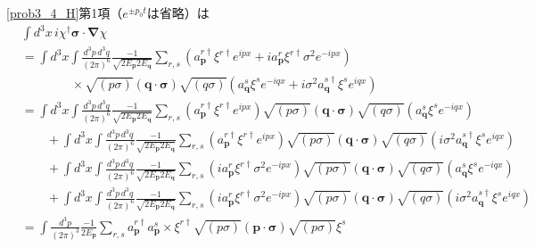 \eqref{prob3_4_H}第1項（$e^{\pm p_0t}$は省略）は
\begin{align*}
  & \int d^3x \, i \chi^\dagger \boldsymbol{\sigma} \cdot \boldsymbol{\nabla} \chi \\
  & = \int d^3x \int \frac{d^3p\, d^3q}{(2\pi)^6} \frac{-1}{\sqrt{2E_{\boldsymbol{p}} 2 E_{\boldsymbol{q}}}}
  \sum_{r, s} \left( a_{\boldsymbol{p}}^{r\dagger} \xi^{r\dagger} e^{ipx} + i a_{\boldsymbol{p}}^{r} \xi^{r\dagger} \sigma^2 e^{-ipx} \right) \\
  & \qquad \qquad \times \sqrt{(p \sigma)} (\boldsymbol{q} \cdot \boldsymbol{\sigma}) \sqrt{(q \sigma)}
  \left( a_{\boldsymbol{q}}^s \xi^s e^{-iqx} + i \sigma^2 a_{\boldsymbol{q}}^{s\dagger} \xi^s e^{iqx} \right) \\
  & = \int d^3x \int \frac{d^3p\, d^3q}{(2\pi)^6} \frac{-1}{\sqrt{2E_{\boldsymbol{p}} 2 E_{\boldsymbol{q}}}}
  \sum_{r, s} \left( a_{\boldsymbol{p}}^{r\dagger} \xi^{r\dagger} e^{ipx} \right)
  \sqrt{(p \sigma)} (\boldsymbol{q} \cdot \boldsymbol{\sigma}) \sqrt{(q \sigma)}
  \left( a_{\boldsymbol{q}}^s \xi^s e^{-iqx} \right) \\
  & \qquad + \int d^3x \int \frac{d^3p\, d^3q}{(2\pi)^6} \frac{-1}{\sqrt{2E_{\boldsymbol{p}} 2 E_{\boldsymbol{q}}}}
  \sum_{r, s} \left( a_{\boldsymbol{p}}^{r\dagger} \xi^{r\dagger} e^{ipx} \right)
  \sqrt{(p \sigma)} (\boldsymbol{q} \cdot \boldsymbol{\sigma}) \sqrt{(q \sigma)}
  \left( i \sigma^2 a_{\boldsymbol{q}}^{s\dagger} \xi^s e^{iqx} \right) \\
  & \qquad + \int d^3x \int \frac{d^3p\, d^3q}{(2\pi)^6} \frac{-1}{\sqrt{2E_{\boldsymbol{p}} 2 E_{\boldsymbol{q}}}}
  \sum_{r, s} \left( i a_{\boldsymbol{p}}^{r} \xi^{r\dagger} \sigma^2 e^{-ipx} \right)
  \sqrt{(p \sigma)} (\boldsymbol{q} \cdot \boldsymbol{\sigma}) \sqrt{(q \sigma)}
  \left( a_{\boldsymbol{q}}^s \xi^s e^{-iqx}\right) \\
  & \qquad + \int d^3x \int \frac{d^3p\, d^3q}{(2\pi)^6} \frac{-1}{\sqrt{2E_{\boldsymbol{p}} 2 E_{\boldsymbol{q}}}}
  \sum_{r, s} \left( i a_{\boldsymbol{p}}^{r} \xi^{r\dagger} \sigma^2 e^{-ipx} \right)
  \sqrt{(p \sigma)} (\boldsymbol{q} \cdot \boldsymbol{\sigma}) \sqrt{(q \sigma)}
  \left( i \sigma^2 a_{\boldsymbol{q}}^{s\dagger} \xi^s e^{iqx} \right) \\
  & = \int \frac{d^3p}{(2\pi)^3} \frac{-1}{2E_{\boldsymbol{p}}}
  \sum_{r, s} a_{\boldsymbol{p}}^{r\dagger} a_{\boldsymbol{p}}^s \times \xi^{r\dagger} \sqrt{(p \sigma)}
  (\boldsymbol{p} \cdot \boldsymbol{\sigma}) \sqrt{(p \sigma)} \xi^s \\

\end{align*}

